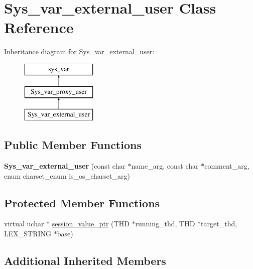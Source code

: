 \hypertarget{classSys__var__external__user}{}\section{Sys\+\_\+var\+\_\+external\+\_\+user Class Reference}
\label{classSys__var__external__user}
Inheritance diagram for Sys\+\_\+var\+\_\+external\+\_\+user\+:\begin{figure}[H]
\begin{center}
\leavevmode
\includegraphics[height=3.000000cm]{classSys__var__external__user}
\end{center}
\end{figure}
\subsection*{Public Member Functions}
\begin{DoxyCompactItemize}
\item 
\mbox{\label{classSys__var__external__user_ae5cd7f47bbd34ea766a39c01e18d14ae}} 
{\bfseries Sys\+\_\+var\+\_\+external\+\_\+user} (const char $\ast$name\+\_\+arg, const char $\ast$comment\+\_\+arg, enum charset\+\_\+enum is\+\_\+os\+\_\+charset\+\_\+arg)
\end{DoxyCompactItemize}
\subsection*{Protected Member Functions}
\begin{DoxyCompactItemize}
\item 
virtual uchar $\ast$ \mbox{\hyperlink{classSys__var__external__user_ac6b27bbbb43cea6353281663397f9b8c}{session\+\_\+value\+\_\+ptr}} (T\+HD $\ast$running\+\_\+thd, T\+HD $\ast$target\+\_\+thd, L\+E\+X\+\_\+\+S\+T\+R\+I\+NG $\ast$base)
\end{DoxyCompactItemize}
\subsection*{Additional Inherited Members}


